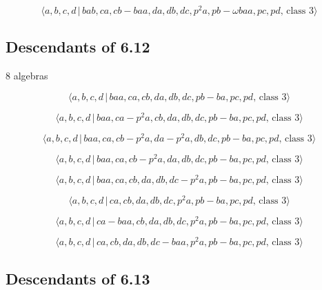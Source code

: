 \documentclass[10pt]{article}
\begin{document}
\begin{equation}
\langle a,b,c,d\,|\,bab,ca,cb-baa,da,db,dc,p^{2}a,pb-\omega baa,pc,pd,\,%
\text{class }3\rangle  \tag{7.3647}
\end{equation}

\subsection{Descendants of 6.12}

8 algebras

\begin{equation}
\langle a,b,c,d\,|\,baa,ca,cb,da,db,dc,pb-ba,pc,pd,\,\text{class }3\rangle 
\tag{7.3648}
\end{equation}

\begin{equation}
\langle a,b,c,d\,|\,baa,ca-p^2a,cb,da,db,dc,pb-ba,pc,pd,\,\text{class }%
3\rangle  \tag{7.3649}
\end{equation}

\begin{equation}
\langle a,b,c,d\,|\,baa,ca,cb-p^2a,da-p^2a,db,dc,pb-ba,pc,pd,\,\text{class }%
3\rangle  \tag{7.3650}
\end{equation}

\begin{equation}
\langle a,b,c,d\,|\,baa,ca,cb-p^2a,da,db,dc,pb-ba,pc,pd,\,\text{class }%
3\rangle  \tag{7.3651}
\end{equation}

\begin{equation}
\langle a,b,c,d\,|\,baa,ca,cb,da,db,dc-p^2a,pb-ba,pc,pd,\,\text{class }%
3\rangle  \tag{7.3652}
\end{equation}

\begin{equation}
\langle a,b,c,d\,|\,ca,cb,da,db,dc,p^2a,pb-ba,pc,pd,\,\text{class }3\rangle 
\tag{7.3653}
\end{equation}

\begin{equation}
\langle a,b,c,d\,|\,ca-baa,cb,da,db,dc,p^2a,pb-ba,pc,pd,\,\text{class }%
3\rangle  \tag{7.3654}
\end{equation}

\begin{equation}
\langle a,b,c,d\,|\,ca,cb,da,db,dc-baa,p^2a,pb-ba,pc,pd,\,\text{class }%
3\rangle  \tag{7.3655}
\end{equation}

\subsection{Descendants of 6.13}
\end{document}
